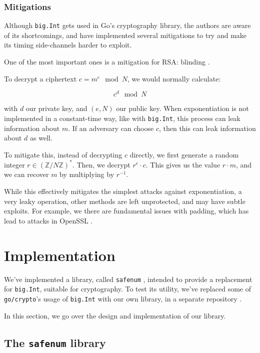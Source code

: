 \documentclass[11pt, a4paper]{article} %
\begin{document}
{\subsubsection{Mitigations}

Although \texttt{big.Int} gets used in Go's cryptography library,
the authors are aware of its shortcomings, and have implemented
several mitigations to try and make its timing side-channels harder to
exploit.

One of the most important ones is a mitigation
for RSA: blinding \cite{kocher_timing_1996}.

To decrypt a ciphertext
$c = m^e \mod N$, we would normally calculate:

$$
c^d \mod N
$$

with $d$ our private key, and $(e, N)$ our public key.
When exponentiation is not implemented in a constant-time way, like
with \texttt{big.Int}, this process can leak information about $m$.
If an adversary can choose $c$, then this can leak information about
$d$ as well.

To mitigate this, instead of decrypting $c$ directly,
we first generate a random integer
$r \in (\mathbb{Z}/N\mathbb{Z})^*$. Then, we decrypt $r^e \cdot c$.
This gives us the value $r \cdot m$, and we can recover
$m$ by multiplying by $r^{-1}$.

While this effectively mitigates the simplest attacks
against exponentiation, a very leaky operation,
other methods are left unprotected, and may
have subtle exploits. For
example, we there are fundamental issues with
padding, which has lead to attacks
in OpenSSL \cite{merget_raccoon_2019}.

\section{Implementation}

We've implemented a library, called
\texttt{safenum} \cite{meier_cronokirbysafenum_2021}, intended to provide
a replacement for \texttt{big.Int}, suitable for cryptography.
To test its utility, we've replaced some
of \texttt{go/crypto}'s usage of \texttt{big.Int} with our own library,
in a separate repository
\cite{meier_cronokirbyctcrypto_2021}.

In this section, we go over the design and implementation of our
library.

\subsection{The \texttt{safenum} library}

}
\end{document}
